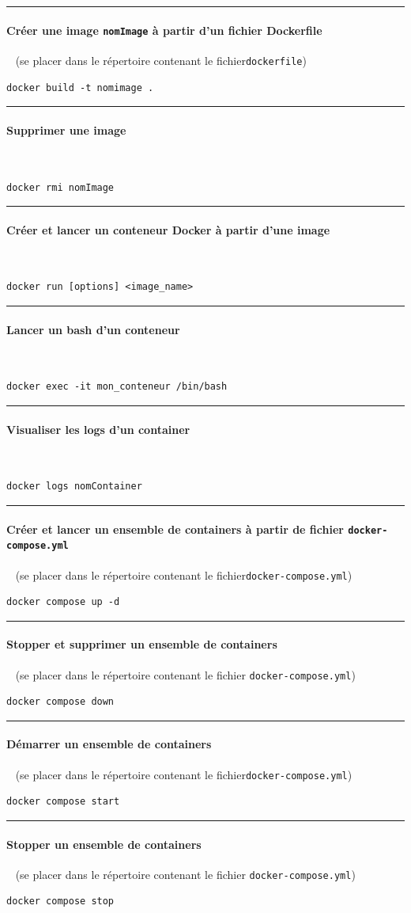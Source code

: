 \documentclass[french, 12pt]{article}%
\newcommand{\paraL}[1]{\tiny\noindent\rule{1.0\linewidth}{0.5pt}\paragraph*{#1}\  \normalsize}
\begin{document}
\paraL{Créer une image \verb?nomImage? à partir d'un fichier Dockerfile} (se placer dans le répertoire contenant le fichier\verb?dockerfile?)

\begin{lstlisting}[style=commande]
docker build -t nomimage .
\end{lstlisting}

\paraL{Supprimer une image}

\begin{lstlisting}[style=commande]
docker rmi nomImage
\end{lstlisting}

\paraL{Créer et lancer un conteneur Docker à partir d'une image }

\begin{lstlisting}[style=commande]
docker run [options] <image_name>
\end{lstlisting}



\paraL{Lancer un bash d'un conteneur} 
\begin{lstlisting}[style=commande]
docker exec -it mon_conteneur /bin/bash
\end{lstlisting}



\paraL{Visualiser les logs d'un container} 
\begin{lstlisting}[style=commande]
docker logs nomContainer
\end{lstlisting}

\paraL{Créer et lancer un ensemble de containers à partir de fichier \verb?docker-compose.yml?} (se placer dans le répertoire contenant le fichier\verb?docker-compose.yml?)

\begin{lstlisting}[style=commande]
docker compose up -d
\end{lstlisting}


\paraL{Stopper et supprimer un ensemble de containers} (se placer dans le répertoire contenant le fichier \verb?docker-compose.yml?)
\begin{lstlisting}[style=commande]
docker compose down
\end{lstlisting}

\paraL{Démarrer un ensemble de containers} (se placer dans le répertoire contenant le fichier\verb?docker-compose.yml?)
\begin{lstlisting}[style=commande]
docker compose start
\end{lstlisting}

\paraL{Stopper un ensemble de containers} (se placer dans le répertoire contenant le fichier \verb?docker-compose.yml?)
\begin{lstlisting}[style=commande]
docker compose stop
\end{lstlisting}
\end{document}
